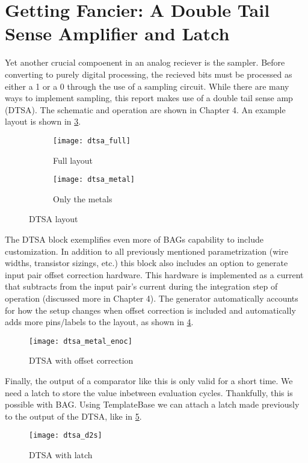 \section{Getting Fancier: A Double Tail Sense Amplifier and Latch}
Yet another crucial compoenent in an analog reciever is the sampler. Before converting to purely digital processing, the recieved bits must be processed as either a 1 or a 0 through the use of a sampling circuit. While there are many ways to implement sampling, this report makes use of a double tail sense amp (DTSA). The schematic and operation are shown in Chapter 4. An example layout is shown in \ref{fig:dtsa_ex}.
\begin{figure}[h]
\centering
\begin{subfigure}{.4\linewidth}
  \centering
  \texttt{[image: dtsa\_full]}
  \caption{Full layout}
  \label{fig:sfig1}
\end{subfigure}
\begin{subfigure}{.4\linewidth}
  \centering
\texttt{[image: dtsa\_metal]}
  \caption{Only the metals}
  \label{fig:sfig2}
\end{subfigure}
\caption{DTSA layout}
\label{fig:dtsa_ex}
\end{figure}
The DTSA block exemplifies even more of BAGs capability to include customization. In addition to all previously mentioned parametrization (wire widths, transistor sizings, etc.) this block also includes an option to generate input pair offset correction hardware. This hardware is implemented as a current that subtracts from the input pair's current during the integration step of operation (discussed more in  Chapter 4). The generator automatically accounts for how the setup changes when offset correction is included and automatically adds more pins/labels to the layout, as shown in \ref{fig:dtsa_enoc}.
\begin{figure}[h]
\centering
\texttt{[image: dtsa\_metal\_enoc]}
\caption{DTSA with offset correction}
\label{fig:dtsa_enoc}
\end{figure}
Finally, the output of a comparator like this is only valid for a short time. We need a latch to store the value inbetween evaluation cycles. Thankfully, this is possible with BAG. Using TemplateBase we can attach a latch made previously to the output of the DTSA, like in \ref{fig:dtsa_d2s}.
\begin{figure}[h]
\centering
\texttt{[image: dtsa\_d2s]}
\caption{DTSA with latch}
\label{fig:dtsa_d2s}
\end{figure}

